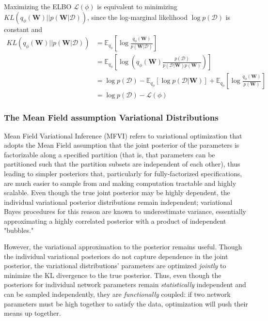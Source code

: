 Maximizing the ELBO $\mathcal{L}(\phi)$ is equivalent to minimizing $KL \left( q_\phi(\mathbf{W}) || p(\mathbf{W}|\mathcal{D}) \right)$, since the log-marginal likelihood $\log p(\mathcal{D})$ is constant and
\begin{equation}
  \begin{aligned}
    KL \left( q_\phi(\mathbf{W}) || p(\mathbf{W}|\mathcal{D}) \right) 
    & =  \mathbb{E}_{q_\phi} 
      \left[ \log \frac{q_\phi(\mathbf{W})}{p(\mathbf{W}|\mathcal{D})} \right] 
    \\
    & =  \mathbb{E}_{q_\phi} 
      \left[ \log \left(
        q_\phi(\mathbf{W}) 
        \frac{p(\mathcal{D})}{p(\mathcal{D}|\mathbf{W})p(\mathbf{W})} 
      \right) \right]
    \\
    & = \log p(\mathcal{D})
    - \mathbb{E}_{q_\phi} \left[\log p(\mathcal{D} | \mathbf{W}) \right]
    + \mathbb{E}_{q_\phi} \left[ \log \frac{q_\phi(\mathbf{W})}{p(\mathbf{W})} \right]
    \\
    & = \log p(\mathcal{D}) - \mathcal{L}(\phi)
  \end{aligned}
\end{equation}



\subsubsection*{The Mean Field assumption Variational Distributions}

Mean Field Variational Inference (MFVI) refers to variational optimization that adopts the Mean Field assumption that the joint posterior of the parameters is factorizable along a specified partition (that is, that parameters can be partitioned such that the partition subsets are independent of each other), thus leading to simpler posteriors that, particularly for fully-factorized specifications, are much easier to sample from and making computation tractable and highly scalable.  Even though the true joint posterior may be highly dependent, the individual variational posterior distributions remain independent; variational Bayes procedures for this reason are known to underestimate variance, essentially approximating a highly correlated posterior with a product of independent "bubbles."  

However, the variational approximation to the posterior remains useful.  Though the individual variational posteriors do not capture dependence in the joint posterior, the variational distributions' parameters are optimized \textit{jointly} to minimize the KL divergence to the true posterior.  Thus, even though the posteriors for individual network parameters remain \textit{statistically} independent and can be sampled independently, they are \textit{functionally} coupled: if two network parameters must be high together to satisfy the data, optimization will push their means up together.  

